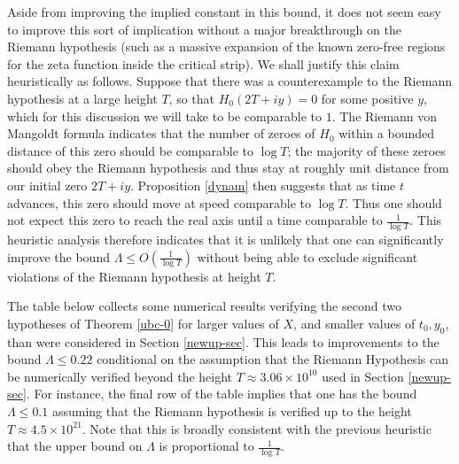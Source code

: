 \documentclass[a4paper,11pt,twoside]{amsart}
\begin{document}
Aside from improving the implied constant in this bound, it does not seem easy to improve this sort of implication without a major breakthrough on the Riemann hypothesis (such as a massive expansion of the known zero-free regions for the zeta function inside the critical strip).  We shall justify this claim heuristically as follows. Suppose that there was a counterexample to the Riemann hypothesis at a large height $T$, so that $H_0(2T + iy) = 0$ for some positive $y$, which for this discussion we will take to be comparable to $1$.  The Riemann von Mangoldt formula indicates that the number of zeroes of $H_0$ within a bounded distance of this zero should be comparable to $\log T$; the majority of these zeroes should obey the Riemann hypothesis and thus stay at roughly unit distance from our initial zero $2T+iy$.  Proposition \ref{dynam} then suggests that as time $t$ advances, this zero should move at speed comparable to $\log T$.  Thus one should not expect this zero to reach the real axis until a time comparable to $\frac{1}{\log T}$.  This heuristic analysis therefore indicates that it is unlikely that one can significantly improve the bound $\Lambda \leq O \left( \frac{1}{\log T} \right )$ without being able to exclude significant violations of the Riemann hypothesis at height $T$.

The table below collects some numerical results verifying the second two hypotheses of Theorem \ref{ubc-0} for larger values of $X$, and smaller values of $t_0,y_0$, than were considered in Section \ref{newup-sec}.  This leads to improvements to the bound $\Lambda \leq 0.22$ conditional on the assumption that the Riemann Hypothesis can be numerically verified beyond the height $T \approx 3.06 \times 10^{10}$ used in Section \ref{newup-sec}.  For instance, the final row of the table implies that one has the bound $\Lambda \leq 0.1$ assuming that the Riemann hypothesis is verified up to the height $T \approx 4.5 \times 10^{21}$.  Note that this is broadly consistent with the previous heuristic that the upper bound on $\Lambda$ is proportional to $\frac{1}{\log T}$.
\end{document}
